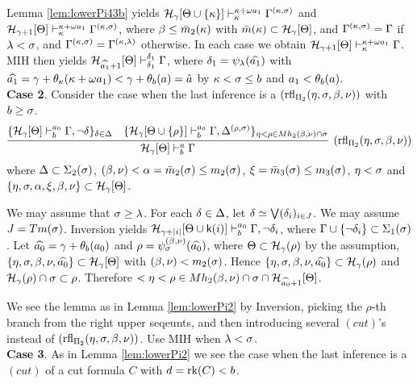 \documentclass{article}
\begin{document}
Lemma \ref{lem:lowerPi43b} yields
$\mathcal{H}_{\gamma}[\Theta\cup \{\kappa\}]\vdash^{\kappa+\omega a_{1}}_{\kappa}\Gamma^{(\kappa,\sigma)}$
and 
$\mathcal{H}_{\gamma+1}[\Theta]\vdash^{\kappa+\omega a_{1}}_{\kappa}\Gamma^{(\kappa,\sigma)}$,
where $\beta\leq\bar{m}_{2}(\kappa)$ 
with
$\bar{m}(\kappa)\subset{\cal H}_{\gamma}[\Theta]$, and
$\Gamma^{(\kappa,\sigma)}=\Gamma$ if $\lambda<\sigma$, and $\Gamma^{(\kappa,\sigma)}=\Gamma^{(\kappa,\lambda)}$
otherwise.
In each case we obtain 
$\mathcal{H}_{\gamma+1}[\Theta]\vdash^{\kappa+\omega a_{1}}_{\kappa}\Gamma$.
MIH then yields
$\mathcal{H}_{\widehat{a_{1}}+1}[\Theta]\vdash^{\delta_{1}}_{\delta_{1}}\Gamma$,
where
$\delta_{1}=\psi_{\lambda}(\widehat{a_{1}})$ with
$\widehat{a_{1}}=\gamma+\theta_{\kappa}(\kappa+\omega a_{1})<\gamma+\theta_{b}(a)=\hat{a}$
by $\kappa<\sigma\leq b$ and $a_{1}<\theta_{b}(a)$.
\\
\textbf{Case 2}. 
Consider the case when the last inference is a 
$({\rm rfl}_{\Pi_{2}}(\eta,\sigma,\beta,\nu))$ with $b\geq\sigma$.
{\small
\[
\infer[({\rm rfl}_{\Pi_{2}}(\eta,\sig,\bet,\nu))]{
\calh_{\gam}[\Tht]\vdash^{a}_{b}\Gam}
{
\{
\mathcal{H}_{\gam}[\Tht]\vdash^{a_{0}}_{b}\Gamma, \lnot\del
\}_{\del\in\Del}
&
\{
\mathcal{H}_{\gam}[\Tht\cup \{\rho\}]\vdash^{a_{0}}_{b}\Gamma, 
\Del^{(\rho,\sig)}\}_{\eta<\rho\in Mh_{2}(\bet,\nu)\cap \sig}
}
\]
}
where 
$\Delta\subset\Sigma_{2}(\sigma)$, 
$(\beta,\nu)<\alpha=\bar{m}_{2}(\sigma)\leq m_{2}(\sigma)$, 
$\xi=\bar{m}_{3}(\sigma)\leq m_{3}(\sigma)$, $\eta<\sigma$
and $\{\eta,\sigma,\alpha,\xi,\beta,\nu\}\subset{\cal H}_{\gamma}[\Theta]$.

We may assume that $\sigma\geq\lambda$.
For each $\delta\in\Delta$, let $\delta\simeq\bigvee(\delta_{i})_{i\in J}$. We may assume
$J=Tm(\sigma)$.
Inversion yields $\mathcal{H}_{\gamma+|i|}[\Theta\cup{\sf k}(i)]\vdash^{a_{0}}_{b}\Gamma, \lnot\delta_{i}$,
where $\Gamma\cup\{\lnot\delta_{i}\}\subset\Sigma_{1}(\sigma)$.
Let $\widehat{{a}_{0}}=\gamma+\theta_{b}(a_{0})$ and
$\rho=\psi_{\sigma}^{(\beta,\nu)}(\widehat{{a}_{0}})$,
where $\Theta\subset{\cal H}_{\gamma}(\rho)$ by the assumption,
$\{\eta,\sigma,\beta,\nu,\widehat{{a}_{0}}\}\subset{\cal H}_{\gamma}[\Theta]$ with $(\beta,\nu)<m_{2}(\sigma)$.
Hence 
$\{\eta,\sigma,\beta,\nu,\widehat{{a}_{0}}\}\subset{\cal H}_{\gamma}(\rho)$ and 
${\cal H}_{\gamma}(\rho)\cap\sigma\subset\rho$.
Therefore $<\eta<\rho\in Mh_{2}(\beta,\nu)\cap\sigma\cap{\cal H}_{\widehat{a_{0}}+1}[\Theta]$.


We see the lemma as in Lemma \ref{lem:lowerPi2} by Inversion, picking the $\rho$-th branch from
the right upper seqeunts, and then introducing several $(cut)$'s
instead of $({\rm rfl}_{\Pi_{2}}(\eta,\sigma,\beta,\nu))$.
Use MIH when $\lambda<\sigma$.
\\
\textbf{Case 3}.
As in Lemma \ref{lem:lowerPi2} we see the case when the last inference is a $(cut)$ of a cut formula $C$ with $d=\mbox{{\rm rk}}(C)<b$.
\eprf
\end{document}
